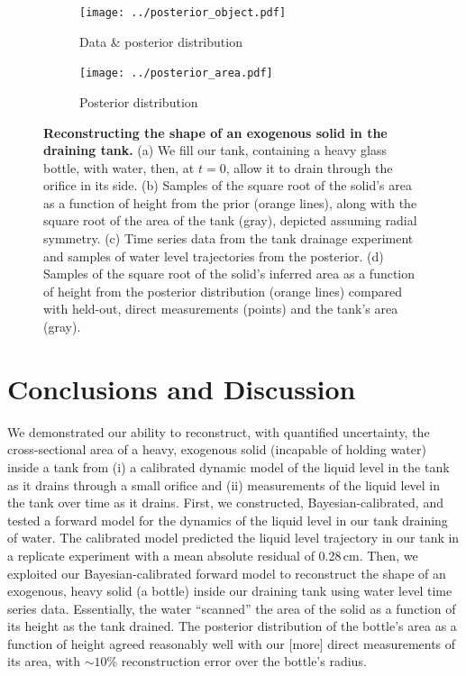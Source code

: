 \documentclass[openacc]{rsproca_new}%
\begin{document}
\begin{figure}[h!]
     \begin{subfigure}[b]{0.49\textwidth}
    	\texttt{[image: ../posterior\_object.pdf]}
	\caption{Data \& posterior distribution} \label{fig:posterior_object}
    \end{subfigure}
    \begin{subfigure}[b]{0.49\textwidth}
    	\texttt{[image: ../posterior\_area.pdf]}
	\caption{Posterior distribution} \label{fig:posterior_area}
    \end{subfigure}
    \caption{
      \textbf{Reconstructing the shape of an exogenous solid in the draining tank.} 
      (a) We fill our tank, containing a heavy glass bottle, with water, then, at $t=0$, allow it to drain through the orifice in its side.
      (b) Samples of the square root of the solid's area as a function of height from the prior (orange lines), along with the square root of the area of the tank (gray), depicted assuming radial symmetry.
      (c) Time series data from the tank drainage experiment and samples of water level trajectories from the posterior.
      (d) Samples of the square root of the solid's inferred area as a function of height from the posterior distribution (orange lines) compared with held-out, direct measurements (points) and the tank's area (gray).
      }
\end{figure}

\section{Conclusions and Discussion}
We demonstrated our ability to reconstruct, with quantified uncertainty, the cross-sectional area of a heavy, exogenous solid (incapable of holding water) inside a tank from (i) a calibrated dynamic model of the liquid level in the tank as it drains through a small orifice and (ii) measurements of the liquid level in the tank over time as it drains.
First, we constructed, Bayesian-calibrated, and tested a forward model for the dynamics of the liquid level in our tank draining of water.
The calibrated model predicted the liquid level trajectory in our tank in a replicate experiment with a mean absolute residual of 0.28\,cm.
Then, we exploited our Bayesian-calibrated forward model to reconstruct the shape of an exogenous, heavy solid (a bottle) inside our draining tank using water level time series data. 
Essentially, the water ``scanned'' the area of the solid as a function of its height as the tank drained. 
The posterior distribution of the bottle's area as a function of height agreed reasonably well with our [more] direct measurements of its area, with $\sim 10$\% reconstruction error over the bottle's radius. 
\end{document}
